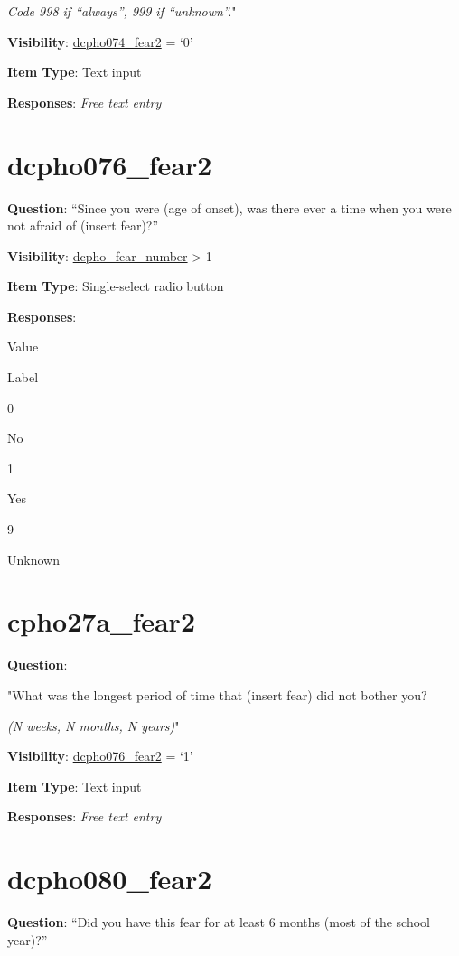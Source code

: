 \documentclass[]{book}
\begin{document}
\emph{Code 998 if ``always'', 999 if ``unknown''.}"

\textbf{Visibility}: \protect\hyperlink{dcpho074_fear2}{dcpho074\_fear2} = `0'

\textbf{Item Type}: Text input

\textbf{Responses}: \emph{Free text entry}

\hypertarget{dcpho076_fear2}{%
\section{dcpho076\_fear2}\label{dcpho076_fear2}}

\textbf{Question}: ``Since you were (age of onset), was there ever a time when you were not afraid of (insert fear)?''

\textbf{Visibility}: \protect\hyperlink{dcpho_fear_number}{dcpho\_fear\_number} \textgreater{} 1

\textbf{Item Type}: Single-select radio button

\textbf{Responses}:

Value

Label

0

No

1

Yes

9

Unknown

\hypertarget{cpho27a_fear2}{%
\section{cpho27a\_fear2}\label{cpho27a_fear2}}

\textbf{Question}:

"What was the longest period of time that (insert fear) did not bother you?

\emph{(N weeks, N months, N years)}"

\textbf{Visibility}: \protect\hyperlink{dcpho076_fear2}{dcpho076\_fear2} = `1'

\textbf{Item Type}: Text input

\textbf{Responses}: \emph{Free text entry}

\hypertarget{dcpho080_fear2}{%
\section{dcpho080\_fear2}\label{dcpho080_fear2}}

\textbf{Question}: ``Did you have this fear for at least 6 months (most of the school year)?''
\end{document}
